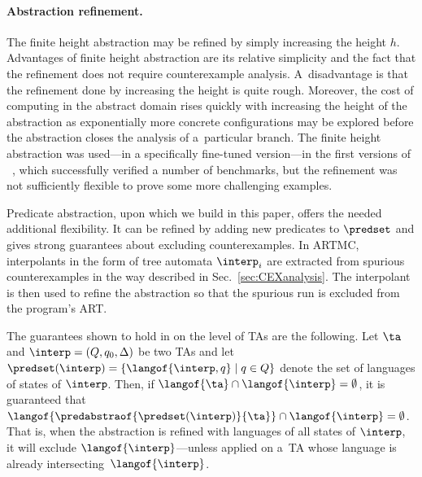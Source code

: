 {%
\paragraph{Abstraction refinement.}

The finite height abstraction may be refined by simply increasing the height
$h$. 
%
Advantages of finite height abstraction are its relative simplicity and the
fact that the refinement does not require counterexample analysis.  
%
A~disadvantage is 
%
%
%
that the refinement done by increasing the height is quite rough.
Moreover, the cost of computing in the abstract domain rises quickly with increasing
the height of the abstraction as exponentially more concrete configurations may be explored
before the abstraction closes the analysis of a~particular branch.
%
%
The finite height abstraction was used---in a specifically fine-tuned
version---in the first versions of \forester{}~\cite{forester12,boxes13}, which
successfully verified a number of benchmarks, but the refinement was not
sufficiently flexible to prove some more challenging examples. 

Predicate abstraction, upon which we build in this paper, offers the needed additional flexibility.  
It can be refined by adding new predicates to $\predset$ and gives strong guarantees about excluding counterexamples.
%
In ARTMC, interpolants in the form of tree automata $\interp_i$ are extracted from spurious counterexamples in the way described in Sec.~\ref{sec:CEXanalysis}.
%
The interpolant is then used to refine the abstraction so that the spurious run is excluded from the program's ART.

The guarantees shown to hold in \cite{artmc} on the level of TAs are 
the following.  
Let $\ta$ and $\interp = (Q,q_0,\Delta)$ be two TAs and 
let $\predset(\interp) = \{\langof{\interp,q}\mid q\in Q\}$ denote the set of languages of states of $\interp$.
%
Then, if $\langof{\ta} \cap \langof{\interp} = \emptyset$, it is guaranteed that 
$\langof{\predabstraof{\predset(\interp)}{\ta}} \cap \langof{\interp} = \emptyset$.
That is, when the abstraction is refined with languages of all states of
$\interp$, it will
exclude $\langof{\interp}$---unless applied on a~TA whose language is already
intersecting~$\langof{\interp}$. 

}
